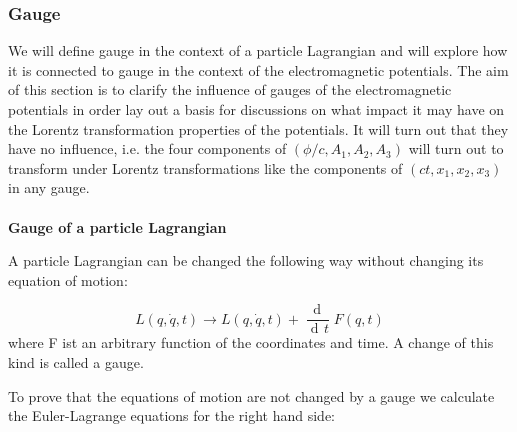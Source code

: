 \documentclass{article}
\DeclareMathOperator{\dd}{d\!}
\begin{document}
\subsubsection{Gauge} \label{sectionGauge}
We will define gauge in the context of a particle Lagrangian and will explore how it is connected to gauge in the context of the electromagnetic potentials.
The aim of this section is to clarify the influence of gauges of the electromagnetic potentials in order lay out a basis for discussions on what
impact it may have on the Lorentz transformation properties of the potentials.
It will turn out that they have no influence,
i.e. the four components of $(\phi/c, A_1,A_2,A_3)$ will turn out to transform under Lorentz transformations like the components of $(ct,x_1,x_2,x_3)$ in any gauge.
\\
\\
\textbf{Gauge of a particle Lagrangian}

\noindent A particle Lagrangian can be changed the following way without changing its equation of motion:

\begin{equation}
    L(q,\dot{q}, t) \rightarrow L(q,\dot{q}, t) + \frac{\dd}{ \dd t} F(q,t)
\end{equation}
where F ist an arbitrary function of the coordinates and time.
A change of this kind is called a gauge.

To prove that the equations of motion are not changed by a gauge we calculate the Euler-Lagrange equations for the right hand side:
\end{document}
